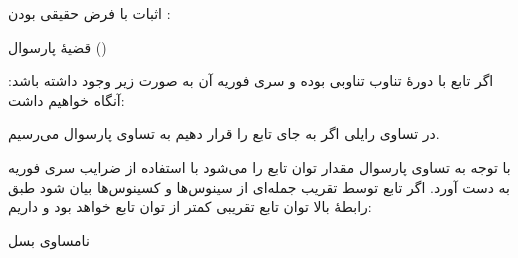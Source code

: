 \begin{EMproof}{}

اثبات با فرض حقیقی بودن :

\end{EMproof}

\EMhold


\begin{EMtheorem}{قضیهٔ پارسوال ()}

اگر تابع  با دورهٔ تناوب  تناوبی بوده و سری فوریه آن به صورت زیر وجود داشته باشد:
آنگاه خواهیم داشت:

\end{EMtheorem}

\begin{EMproof}{}

در تساوی رایلی اگر به جای  تابع  را قرار دهیم به تساوی پارسوال می‌رسیم.

\end{EMproof}

با توجه به تساوی پارسوال مقدار توان تابع  را می‌شود با استفاده از ضرایب سری فوریه به دست آورد. اگر تابع توسط تقریب  جمله‌ای از سینوس‌ها و کسینوس‌ها بیان شود طبق رابطهٔ بالا توان تابع تقریبی کمتر از توان تابع  خواهد بود و داریم:

\begin{EMimportant}{نامساوی بسل}


\end{EMimportant}

